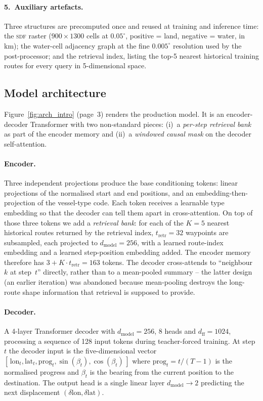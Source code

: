 \documentclass[oneside, a4paper, onecolumn, 11pt]{article}
\newcommand{\sdf}{\textsc{sdf}}
\begin{document}
\paragraph{5.~Auxiliary artefacts.}
Three structures are precomputed once and reused at training and
inference time: the \sdf{} raster ($900 \times 1300$ cells at
$0.05^\circ$, positive = land, negative = water, in km); the
water-cell adjacency graph at the fine $0.005^\circ$ resolution used
by the post-processor; and the retrieval index, listing the top-5
nearest historical training routes for every query in 5-dimensional
space.

\subsection{Model architecture}\label{sec:arch}

Figure~\ref{fig:arch_intro} (page~3) renders the production model.  It
is an encoder-decoder Transformer with two non-standard pieces:
(i)~a \emph{per-step retrieval bank} as part of the encoder memory and
(ii)~a \emph{windowed causal mask} on the decoder self-attention.

\paragraph{Encoder.}
Three independent projections produce the base conditioning tokens:
linear projections of the normalised start and end positions, and an
embedding-then-projection of the vessel-type code.
Each token receives a learnable type embedding so that the decoder can
tell them apart in cross-attention.
On top of those three tokens we add a \emph{retrieval bank}: for each
of the $K = 5$ nearest historical routes returned by the retrieval
index, $t_{\mathrm{retr}} = 32$ waypoints are subsampled, each projected
to $d_{\mathrm{model}} = 256$, with a learned route-index embedding and
a learned step-position embedding added.  The encoder memory therefore
has $3 + K \cdot t_{\mathrm{retr}} = 163$ tokens.
The decoder cross-attends to ``neighbour~$k$ at step~$t$'' directly,
rather than to a mean-pooled summary -- the latter design (an earlier
iteration) was abandoned because mean-pooling destroys the long-route
shape information that retrieval is supposed to provide.

\paragraph{Decoder.}
A 4-layer Transformer decoder with $d_{\mathrm{model}} = 256$,
8 heads and $d_{\mathrm{ff}} = 1024$, processing a sequence of 128
input tokens during teacher-forced training.  At step $t$ the decoder
input is the five-dimensional vector
$[\,\mathrm{lon}_t, \mathrm{lat}_t, \mathrm{prog}_t,
   \sin(\beta_t), \cos(\beta_t)\,]$ where
$\mathrm{prog}_t = t / (T-1)$ is the normalised progress and $\beta_t$
is the bearing from the current position to the destination.  The
output head is a single linear layer $d_{\mathrm{model}} \to 2$
predicting the next displacement $(\delta\mathrm{lon},
\delta\mathrm{lat})$.
\end{document}
